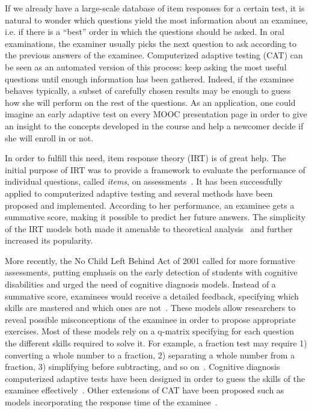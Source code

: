 \documentclass{sig-alternate}
\begin{document}
If we already have a large-scale database of item responses for a certain test, it is natural to wonder which questions yield the most information about an examinee, i.e. if there is a ``best'' order in which the questions should be asked. In oral examinations, the examiner usually picks the next question to ask according to the previous answers of the examinee. Computerized adaptive testing (CAT) can be seen as an automated version of this process: keep asking the most useful questions until enough information has been gathered. Indeed, if the examinee behaves typically, a subset of carefully chosen results may be enough to guess how she will perform on the rest of the questions. As an application, one could imagine an early adaptive test on every MOOC presentation page in order to give an insight to the concepts developed in the course and help a newcomer decide if she will enroll in or not.

In order to fulfill this need, item response theory (IRT) is of great help. The initial purpose of IRT was to provide a framework to evaluate the performance of individual questions, called \emph{items}, on assessments~\cite{Hambleton1991}. It has been successfully applied to computerized adaptive testing and several methods have been proposed and implemented. According to her performance, an examinee gets a summative score, making it possible to predict her future answers. The simplicity of the IRT models both made it amenable to theoretical analysis~\cite{Baker2004} and further increased its popularity.

More recently, the No Child Left Behind Act of 2001 called for more formative assessments, putting emphasis on the early detection of students with cognitive disabilities and urged the need of cognitive diagnosis models. Instead of a summative score, examinees would receive a detailed feedback, specifying which skills are mastered and which ones are not~\cite{Cheng2009}. These models allow researchers to reveal possible misconceptions of the examinee in order to propose appropriate exercises. Most of these models rely on a q-matrix specifying for each question the different skills required to solve it. For example, a fraction test may require 1) converting a whole number to a fraction, 2) separating a whole number from a fraction, 3) simplifying before subtracting, and so on~\cite{DeLaTorreDouglas2004}. Cognitive diagnosis computerized adaptive tests have been designed in order to guess the skills of the examinee effectively~\cite{Cheng2009}. Other extensions of CAT have been proposed such as models incorporating the response time of the examinee~\cite{Chang2014}.
\end{document}
